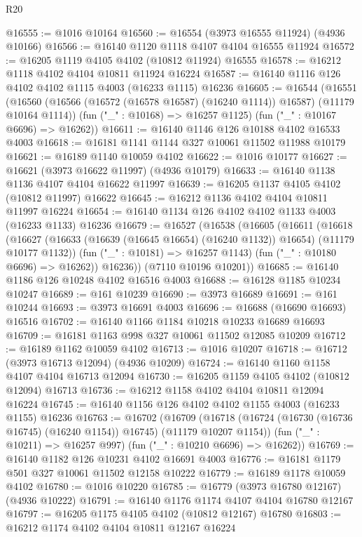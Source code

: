 \begin{lexlean}{R20}
\begin{coremodule}
@16555 := @1016 @10164
@16560 := @16554 (@3973 @16555 @11924) (@4936 @10166)
@16566 := @16140 @1120 @1118 @4107 @4104 @16555 @11924
@16572 := @16205 @1119 @4105 @4102 (@10812 @11924) @16555
@16578 := @16212 @1118 @4102 @4104 @10811 @11924 @16224
@16587 := @16140 @1116 @126 @4102 @4102 @1115 @4003 (@16233 @1115) @16236
@16605 := @16544
    (@16551
      (@16560 (@16566 (@16572 (@16578 @16587) (@16240 @1114)) @16587) (@11179 @10164 @1114))
      (fun ("_" : @10168) => @16257 @1125)
      (fun ("_" : @10167 @6696) => @16262))
@16611 := @16140 @1146 @126 @10188 @4102 @16533 @4003
@16618 := @16181 @1141 @1144 @327 @10061 @11502 @11988 @10179
@16621 := @16189 @1140 @10059 @4102
@16622 := @1016 @10177
@16627 := @16621 (@3973 @16622 @11997) (@4936 @10179)
@16633 := @16140 @1138 @1136 @4107 @4104 @16622 @11997
@16639 := @16205 @1137 @4105 @4102 (@10812 @11997) @16622
@16645 := @16212 @1136 @4102 @4104 @10811 @11997 @16224
@16654 := @16140 @1134 @126 @4102 @4102 @1133 @4003 (@16233 @1133) @16236
@16679 := @16527
    (@16538
      (@16605
        (@16611
          (@16618
            (@16627 (@16633 (@16639 (@16645 @16654) (@16240 @1132)) @16654) (@11179 @10177 @1132))
            (fun ("_" : @10181) => @16257 @1143)
            (fun ("_" : @10180 @6696) => @16262))
          @16236))
      (@7110 @10196 @10201))
@16685 := @16140 @1186 @126 @10248 @4102 @16516 @4003
@16688 := @16128 @1185 @10234 @10247
@16689 := @161 @10239
@16690 := @3973 @16689
@16691 := @161 @10244
@16693 := @3973 @16691 @4003
@16696 := @16688 (@16690 @16693) @16516
@16702 := @16140 @1166 @1184 @10218 @10233 @16689 @16693
@16709 := @16181 @1163 @998 @327 @10061 @11502 @12085 @10209
@16712 := @16189 @1162 @10059 @4102
@16713 := @1016 @10207
@16718 := @16712 (@3973 @16713 @12094) (@4936 @10209)
@16724 := @16140 @1160 @1158 @4107 @4104 @16713 @12094
@16730 := @16205 @1159 @4105 @4102 (@10812 @12094) @16713
@16736 := @16212 @1158 @4102 @4104 @10811 @12094 @16224
@16745 := @16140 @1156 @126 @4102 @4102 @1155 @4003 (@16233 @1155) @16236
@16763 := @16702
    (@16709
      (@16718 (@16724 (@16730 (@16736 @16745) (@16240 @1154)) @16745) (@11179 @10207 @1154))
      (fun ("_" : @10211) => @16257 @997)
      (fun ("_" : @10210 @6696) => @16262))
@16769 := @16140 @1182 @126 @10231 @4102 @16691 @4003
@16776 := @16181 @1179 @501 @327 @10061 @11502 @12158 @10222
@16779 := @16189 @1178 @10059 @4102
@16780 := @1016 @10220
@16785 := @16779 (@3973 @16780 @12167) (@4936 @10222)
@16791 := @16140 @1176 @1174 @4107 @4104 @16780 @12167
@16797 := @16205 @1175 @4105 @4102 (@10812 @12167) @16780
@16803 := @16212 @1174 @4102 @4104 @10811 @12167 @16224

\end{coremodule}
\end{lexlean}
